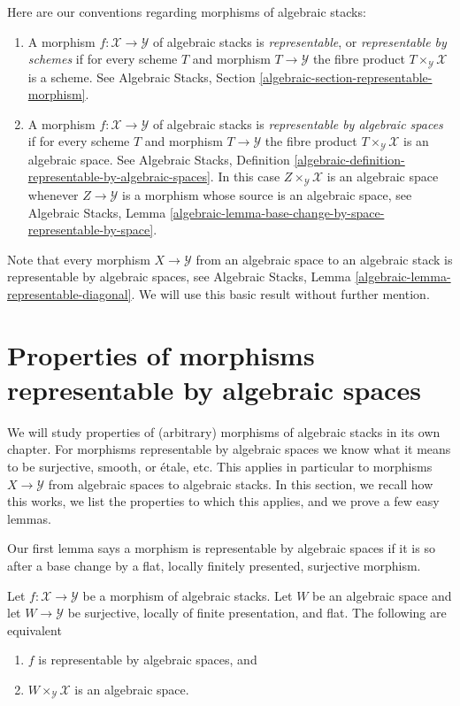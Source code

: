 Here are our conventions regarding morphisms of algebraic stacks:
\begin{enumerate}
\item A morphism $f : \mathcal{X} \to \mathcal{Y}$
of algebraic stacks is {\it representable}, or
{\it representable by schemes} if for every scheme
$T$ and morphism $T \to \mathcal{Y}$ the fibre product
$T \times_\mathcal{Y} \mathcal{X}$ is a scheme.
See
Algebraic Stacks, Section \ref{algebraic-section-representable-morphism}.
\item A morphism $f : \mathcal{X} \to \mathcal{Y}$
of algebraic stacks is {\it representable by algebraic spaces}
if for every scheme $T$ and morphism $T \to \mathcal{Y}$ the fibre product
$T \times_\mathcal{Y} \mathcal{X}$ is an algebraic space.
See Algebraic Stacks,
Definition \ref{algebraic-definition-representable-by-algebraic-spaces}.
In this case $Z \times_\mathcal{Y} \mathcal{X}$ is an algebraic
space whenever $Z \to \mathcal{Y}$ is a morphism whose source is
an algebraic space, see
Algebraic Stacks,
Lemma \ref{algebraic-lemma-base-change-by-space-representable-by-space}.
\end{enumerate}
Note that every morphism $X \to \mathcal{Y}$ from an algebraic space
to an algebraic stack is representable by algebraic spaces, see
Algebraic Stacks, Lemma \ref{algebraic-lemma-representable-diagonal}.
We will use this basic result without further mention.




\section{Properties of morphisms representable by algebraic spaces}
\label{section-properties-morphisms}

\noindent
We will study properties of (arbitrary) morphisms of algebraic stacks in its
own chapter. For morphisms representable by algebraic spaces we know what
it means to be surjective, smooth, or \'etale, etc. This applies in particular
to morphisms $X \to \mathcal{Y}$ from algebraic spaces to algebraic stacks.
In this section, we recall how this works, we list the properties to which
this applies, and we prove a few easy lemmas.

\medskip\noindent
Our first lemma says a morphism is representable by algebraic spaces
if it is so after a base change by a flat,
locally finitely presented, surjective morphism.

\begin{lemma}
\label{lemma-check-representable-covering}
Let $f : \mathcal{X} \to \mathcal{Y}$ be a morphism of algebraic stacks.
Let $W$ be an algebraic space and let $W \to \mathcal{Y}$ be surjective,
locally of finite presentation, and flat. The following are equivalent
\begin{enumerate}
\item $f$ is representable by algebraic spaces, and
\item $W \times_\mathcal{Y} \mathcal{X}$ is an algebraic space.
\end{enumerate}
\end{lemma}

